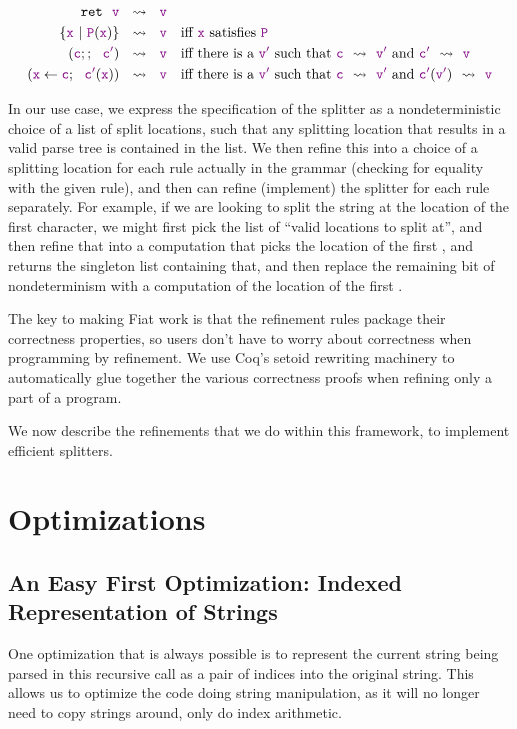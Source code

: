     \begin{align*}
      \texttt{ret}~~\textcolor{violet}{\texttt{v}}&~~\rightsquigarrow~~\textcolor{violet}{\texttt{v}} \\
      \{\textcolor{violet}{\texttt{x}}~|~\textcolor{violet}{\texttt{P}}(\textcolor{violet}{\texttt{x}})\}&~~\rightsquigarrow~~\textcolor{violet}{\texttt{v}}\quad\text{iff \textcolor{violet}{\texttt{x}} satisfies \textcolor{violet}{\texttt{P}}} \\
      (\textcolor{violet}{\texttt{c}};;~~\textcolor{violet}{\texttt{c$'$}})&~~\rightsquigarrow~~\textcolor{violet}{\texttt{v}}\quad\text{iff there is a \textcolor{violet}{\texttt{v$'$}} such that \textcolor{violet}{\texttt{c}}~~\ensuremath{\rightsquigarrow}~~\textcolor{violet}{\texttt{v$'$}} and \textcolor{violet}{\texttt{c$'$}}~~\ensuremath{\rightsquigarrow}~~\textcolor{violet}{\texttt{v}}} \\
      (\textcolor{violet}{\texttt{x}} \leftarrow \textcolor{violet}{\texttt{c}};~~\textcolor{violet}{\texttt{c$'$}}(\textcolor{violet}{\texttt{x}}))&~~\rightsquigarrow~~\textcolor{violet}{\texttt{v}}\quad\text{iff there is a \textcolor{violet}{\texttt{v$'$}} such that \textcolor{violet}{\texttt{c}}~~\ensuremath{\rightsquigarrow}~~\textcolor{violet}{\texttt{v$'$}} and \textcolor{violet}{\texttt{c$'$}}(\textcolor{violet}{\texttt{v$'$}})~~\ensuremath{\rightsquigarrow}~~\textcolor{violet}{\texttt{v}}}
    \end{align*}
    
    In our use case, we express the specification of the splitter as a nondeterministic choice of a list of split locations, such that any splitting location that results in a valid parse tree is contained in the list.  We then refine this into a choice of a splitting location for each rule actually in the grammar (checking for equality with the given rule), and then can refine (implement) the splitter for each rule separately.   For example, if we are looking to split the string at the location of the first \terminal{+} character, we might first pick the list of ``valid locations to split at'', and then refine that into a computation that picks the location of the first \terminal{+}, and returns the singleton list containing that, and then replace the remaining bit of nondeterminism with a computation of the location of the first \terminal{+}. 
    
    The key to making Fiat work is that the refinement rules package their correctness properties, so users don't have to worry about correctness when programming by refinement.  We use Coq's setoid rewriting machinery to automatically glue together the various correctness proofs when refining only a part of a program.
    
    We now describe the refinements that we do within this framework, to implement efficient splitters.
    
\section{Optimizations}
  \subsection{An Easy First Optimization: Indexed Representation of Strings}
    One optimization that is always possible is to represent the current string being parsed in this recursive call as a pair of indices into the original string.  This allows us to optimize the code doing string manipulation, as it will no longer need to copy strings around, only do index arithmetic.
    
